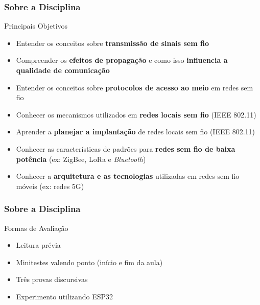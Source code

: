 \documentclass[10pt,xcolor=table]{beamer}
\begin{document}
\begin{frame}
	\frametitle{Sobre a Disciplina}
        \begin{block}{\small Principais Objetivos}
    		\begin{itemize}
    			\item \small Entender os conceitos sobre \textbf{transmissão de sinais sem fio}
                \vspace{1mm}
                \item \small Compreender os \textbf{efeitos de propagação} e como isso \textbf{influencia a qualidade de comunicação}
                \vspace{1mm}
                \item \small  Entender os conceitos sobre \textbf{protocolos de acesso ao meio} em redes sem fio
                \vspace{1mm}
                \item \small  Conhecer os mecanismos utilizados em \textbf{redes locais sem fio} (IEEE 802.11)
                \vspace{1mm}
                \item \small  Aprender a \textbf{planejar a implantação} de redes locais sem fio (IEEE 802.11)
                \vspace{1mm}
                \item \small  Conhecer as características de padrões para \textbf{redes sem fio de baixa potência} (ex: ZigBee, LoRa e \textit{Bluetooth})
                \vspace{1mm}
                \item \small  Conhecer a \textbf{arquitetura e as tecnologias} utilizadas em redes sem fio móveis (ex: redes 5G)
    		\end{itemize}
    	\end{block}
\end{frame}

\begin{frame}
	\frametitle{Sobre a Disciplina}
        \begin{block}{Formas de Avaliação}
    		\begin{itemize}
                \item Leitura prévia
                \vspace{2mm}
    			\item Minitestes valendo ponto (início e fim da aula)
                \vspace{2mm}
                \item Três provas discursivas
                \vspace{2mm}
                \item Experimento utilizando ESP32
    		\end{itemize}
    	\end{block}
\end{frame}
\end{document}
